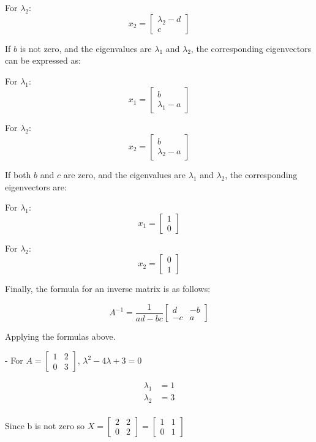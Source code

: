 \documentclass{article}
\begin{document}
For \(\lambda_2\):
\[
x_2 = \begin{bmatrix} \lambda_2 - d \\ c \end{bmatrix}
\]

If \( b \) is not zero, and the eigenvalues are \( \lambda_1 \) and \( \lambda_2 \), the corresponding eigenvectors can be expressed as:

For \( \lambda_1 \):
\[
x_1 = \begin{bmatrix} b \\ \lambda_1 - a \end{bmatrix}
\]

For \( \lambda_2 \):
\[
x_2 = \begin{bmatrix} b \\ \lambda_2 - a \end{bmatrix}
\]

If both \( b \) and \( c \) are zero, and the eigenvalues are \( \lambda_1 \) and \( \lambda_2 \), the corresponding eigenvectors are:

For \( \lambda_1 \):
\[
x_1 = \begin{bmatrix} 1 \\ 0 \end{bmatrix}
\]

For \( \lambda_2 \):
\[
x_2 = \begin{bmatrix} 0 \\ 1 \end{bmatrix}
\]

Finally, the formula for an inverse matrix is as follows:

\[
A^{-1} = \frac{1}{ad - bc} \begin{bmatrix} d & -b \\ -c & a \end{bmatrix}
\]

Applying the formulas above.

- For \( A = \begin{bmatrix} 1 & 2 \\ 0 & 3 \end{bmatrix} \), \( \lambda^2 - 4\lambda + 3 = 0 \)

\[
\begin{aligned}
    \lambda_1 &= 1 \\
    \lambda_2 &= 3 \\
\end{aligned}
\]

Since b is not zero so \( X = \begin{bmatrix} 2 & 2 \\ 0 & 2 \end{bmatrix} = \begin{bmatrix} 1 & 1 \\ 0 & 1 \end{bmatrix} \)
\end{document}
